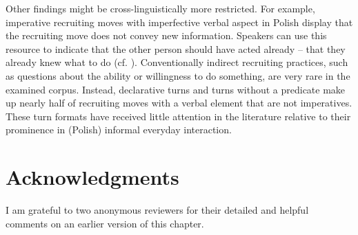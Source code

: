 \documentclass[output=paper]{langsci/langscibook}
\begin{document}
Other findings might be cross-linguistically more restricted.  For example, imperative recruiting moves with imperfective verbal aspect in Polish display that the recruiting move does not convey new information. Speakers can use this resource to indicate that the other person should have acted already -- that they already knew what to do (cf. \citealt{KentKendrick2016}). Conventionally indirect \citep{BrownLevinson1987} recruiting practices, such as questions about the ability or willingness to do something, are very rare in the examined corpus.  Instead, declarative turns and turns without a predicate make up nearly half of recruiting moves with a verbal element that are not imperatives. These turn formats have received little attention in the literature relative to their prominence in (Polish) informal everyday interaction.

\section*{Acknowledgments}

I am grateful to two anonymous reviewers for their detailed and helpful comments on an earlier version of this chapter.


\sloppy
\printbibliography[heading=subbibliography,notkeyword=this]
\end{document}
